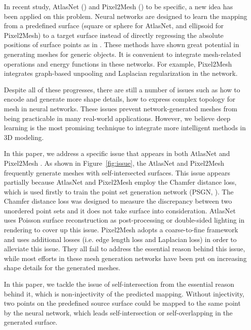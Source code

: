 In recent study, AtlasNet (\cite{atlasnet}) and Pixel2Mesh (\cite{pixel2mesh}) to be specific, a new idea has been applied on this problem. Neural networks are designed to learn the mapping from a predefined surface (square or sphere for AtlasNet, and ellipsoid for Pixel2Mesh) to a target surface instead of directly regressing the absolute positions of surface points as in \cite{PSGN}. These methods have shown great potential in generating meshes for generic objects. It is convenient to integrate mesh-related operations and energy functions in these networks. For example, Pixel2Mesh integrates graph-based unpooling and Laplacian regularization in the network.

Despite all of these progresses, there are still a number of issues such as how to encode and generate more shape details, how to express complex topology for mesh in neural networks. These issues prevent network-generated meshes from being practicable in many real-world applications. However, we believe deep learning is the most promising technique to integrate more intelligent methods in 3D modeling.

 In this paper, we address a specific issue that appears in both AtlasNet \cite{atlasnet} and Pixel2Mesh \cite{pixel2mesh}. As shown in Figure~\ref{fig:issue}, the AtlasNet and Pixel2Mesh frequently generate meshes with self-intersected surfaces. This issue appears partially because AtlasNet and Pixel2Mesh employ the Chamfer distance loss, which is used firstly to train the point set generation network (PSGN, \cite{PSGN}). The Chamfer distance loss was designed to measure the discrepancy between two unordered point sets and it does not take surface into consideration. AtlasNet uses Poisson surface reconstruction as post-processing or double-sided lighting in rendering to cover up this issue. Pixel2Mesh adopts a coarse-to-fine framework and uses additional losses (i.e. edge length loss and Laplacian loss) in order to alleviate this issue. They all fail to address the essential reason behind this issue, while most efforts in these mesh generation networks have been put on increasing shape details for the generated meshes.

In this paper, we tackle the issue of self-intersection from the essential reason behind it, which is non-injectivity of the predicted mapping. Without injectivity, two points on the predefined source surface could be mapped to the same point by the neural network, which leads self-intersection or self-overlapping in the generated surface.

